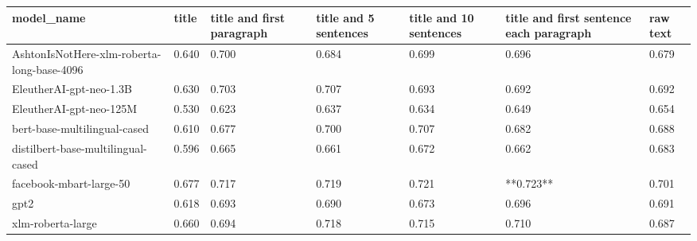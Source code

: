 \begin{tabular}{lllllll}
\toprule
                                model\_name & title & title and first paragraph & title and 5 sentences & title and 10 sentences & title and first sentence each paragraph & raw text \\
\midrule
AshtonIsNotHere-xlm-roberta-long-base-4096 & 0.640 &                     0.700 &                 0.684 &                  0.699 &                                   0.696 &    0.679 \\
                   EleutherAI-gpt-neo-1.3B & 0.630 &                     0.703 &                 0.707 &                  0.693 &                                   0.692 &    0.692 \\
                   EleutherAI-gpt-neo-125M & 0.530 &                     0.623 &                 0.637 &                  0.634 &                                   0.649 &    0.654 \\
              bert-base-multilingual-cased & 0.610 &                     0.677 &                 0.700 &                  0.707 &                                   0.682 &    0.688 \\
        distilbert-base-multilingual-cased & 0.596 &                     0.665 &                 0.661 &                  0.672 &                                   0.662 &    0.683 \\
                   facebook-mbart-large-50 & 0.677 &                     0.717 &                 0.719 &                  0.721 &                               **0.723** &    0.701 \\
                                      gpt2 & 0.618 &                     0.693 &                 0.690 &                  0.673 &                                   0.696 &    0.691 \\
                         xlm-roberta-large & 0.660 &                     0.694 &                 0.718 &                  0.715 &                                   0.710 &    0.687 \\
\bottomrule
\end{tabular}

